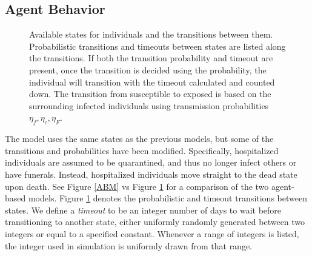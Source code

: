 \subsection{Agent Behavior}
\begin{figure}[h!t]
\begin{center}
\end{center}
\caption{Available states for individuals and the transitions between them. Probabilistic transitions and timeouts between states are listed along the transitions. If both the transition probability and timeout are present, once the transition is decided using the probability, the individual will transition with the timeout calculated and counted down. The transition from susceptible to exposed is based on the surrounding infected individuals using transmission probabilities $\eta_f,\eta_c,\eta_F$.}
\label{fig:sabm-states}
\end{figure}

The model uses the same states as the previous models, but some of the transitions and probabilities have been modified. Specifically, hospitalized individuals are assumed to be quarantined, and thus no longer infect others or have funerals. Instead, hospitalized individuals move straight to the dead state upon death. See Figure \ref{ABM} vs Figure \ref{fig:sabm-states} for a comparison of the two agent-based models. Figure \ref{fig:sabm-states} denotes the probabilistic and timeout transitions between states. We define a \emph{timeout} to be an integer number of days to wait before transitioning to another state, either uniformly randomly generated between two integers or equal to a specified constant. Whenever a range of integers is listed, the integer used in simulation is uniformly drawn from that range.

